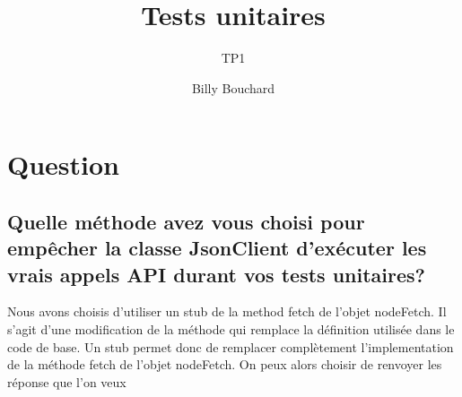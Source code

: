 \documentclass{article}
\title{Tests unitaires}
\subtitle{TP1}
\author{Billy Bouchard}{Jacob Dorais}{}
\begin{document}
\maketitle
\section*{Question}
\subsection*{Quelle méthode avez vous choisi pour empêcher la classe JsonClient d’exécuter
  les vrais appels API durant vos tests unitaires?}
Nous avons choisis d'utiliser un stub de la method fetch de l'objet nodeFetch.
Il s'agit d'une modification de la méthode qui remplace la définition utilisée dans le code de base.
Un stub permet donc de remplacer complètement l'implementation de la méthode fetch de l'objet nodeFetch.
On peux alors choisir de renvoyer les réponse que l'on veux
\end{document}
